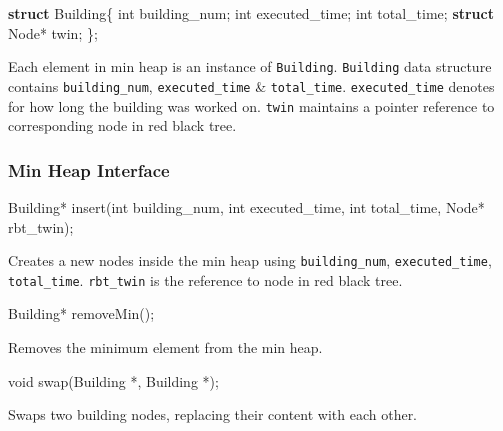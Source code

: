 \documentclass[
]{article}
\newenvironment{Shaded}{}{}
\newcommand{\DataTypeTok}[1]{\textcolor[rgb]{0.56,0.13,0.00}{#1}}
\newcommand{\KeywordTok}[1]{\textcolor[rgb]{0.00,0.44,0.13}{\textbf{#1}}}
\newcommand{\NormalTok}[1]{#1}
\begin{document}
\begin{Shaded}
\begin{Highlighting}[]
\KeywordTok{struct}\NormalTok{ Building\{}
    \DataTypeTok{int}\NormalTok{ building_num;}
    \DataTypeTok{int}\NormalTok{ executed_time;}
    \DataTypeTok{int}\NormalTok{ total_time;}
    \KeywordTok{struct}\NormalTok{ Node* twin;}
\NormalTok{\};}
\end{Highlighting}
\end{Shaded}

Each element in min heap is an instance of \texttt{Building}.
\texttt{Building} data structure contains \texttt{building\_num},
\texttt{executed\_time} \& \texttt{total\_time}. \texttt{executed\_time}
denotes for how long the building was worked on. \texttt{twin} maintains
a pointer reference to corresponding node in red black tree.

\hypertarget{min-heap-interface}{%
\subsubsection{Min Heap Interface}\label{min-heap-interface}}

\begin{Shaded}
\begin{Highlighting}[]
\NormalTok{Building* insert(}\DataTypeTok{int}\NormalTok{ building_num, }\DataTypeTok{int}\NormalTok{ executed_time, }\DataTypeTok{int}\NormalTok{ total_time, Node* rbt_twin);}
\end{Highlighting}
\end{Shaded}

Creates a new nodes inside the min heap using \texttt{building\_num},
\texttt{executed\_time}, \texttt{total\_time}. \texttt{rbt\_twin} is the
reference to node in red black tree.

\begin{Shaded}
\begin{Highlighting}[]
\NormalTok{Building* removeMin();}
\end{Highlighting}
\end{Shaded}

Removes the minimum element from the min heap.

\begin{Shaded}
\begin{Highlighting}[]
\DataTypeTok{void}\NormalTok{ swap(Building *, Building *);}
\end{Highlighting}
\end{Shaded}

Swaps two building nodes, replacing their content with each other.
\end{document}
